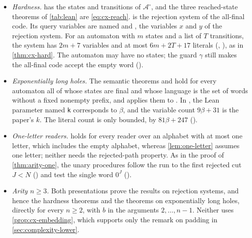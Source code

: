 \begin{itemize}[leftmargin=*]
for every binary automaton , which is given by
Boolean predicates for the initial and final states and a list of
transitions. Its variables $x$, $g$, and $b$ are named as in the
paper, and its variable $y$ receives the lower literals of the initial
states directly, one for each listed transition from an initial state; the
paper's state $q_{\mathrm{in}}$ packages the same literals, up to
repetition. , which is
\cref{lem:cx-rejection}(2), holds for every automaton. The countermodel
theorems assume that all states are final and that the empty word is
accepted, which for such an automaton is the paper's condition
$I\ne\varnothing$. The equivalence with universality is not stated
separately for rejection systems; it is proved for the two families below.
\item \emph{Hardness.}  has the states and
transitions of $\mathcal A^\circ$, and the three reached-state theorems of
\cref{tab:lean} are \eqref{eq:cx-reach}.  is
the rejection system of the all-final code. Its query variables are named
 and , the variables $x$ and $y$ of the
rejection system. For an automaton with $m$ states and a list of $T$
transitions, the system has $2m+7$ variables and at most $6m+2T+17$
literals (,
), as in \cref{thm:cx-hard}. The
automaton may have no states; the guard $\gamma$ still makes the all-final
code accept the empty word ().
\item \emph{Exponentially long holes.} The semantic theorems
 and 
hold for every automaton all of whose states are final and whose language is
the set of words without a
fixed nonempty prefix, and  applies them to
. In , the
Lean parameter named \texttt{k} corresponds to $\beta$, and the variable count
$9\beta+31$ is the paper's $k$. The literal count is only bounded, by $81\beta+247$
().
\item \emph{One-letter readers.} 
holds for every reader over an alphabet with at most one letter, which
includes the empty alphabet, whereas \cref{lem:one-letter} assumes one
letter; neither needs the rejected-path property. As in the proof of
\cref{thm:arity-one}, the unary procedures follow the run to the first
rejected cut $J<N$ () and test the
single word $0^J$ ().
\item \emph{Arity $n\ge3$.} Both presentations prove the results on
rejection systems, and hence the hardness theorems and the theorems on
exponentially long holes, directly for every $n\ge2$, with $b$ in the
arguments $2,\ldots,n-1$. Neither uses \cref{prop:cx-embedding}, which
supports only the remark on padding in \cref{sec:complexity-lower}.
\end{itemize}
